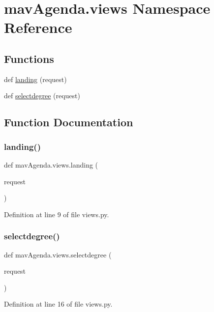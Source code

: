 \hypertarget{namespacemavAgenda_1_1views}{}\section{mav\+Agenda.\+views Namespace Reference}
\label{namespacemavAgenda_1_1views}
\subsection*{Functions}
\begin{DoxyCompactItemize}
\item 
def \mbox{\hyperlink{namespacemavAgenda_1_1views_a8653f38c95e8def94a868eeb549fd0c2}{landing}} (request)
\item 
def \mbox{\hyperlink{namespacemavAgenda_1_1views_a64ca2f2eecfd09c44da85271651c9af2}{selectdegree}} (request)
\end{DoxyCompactItemize}


\subsection{Function Documentation}
\mbox{\label{namespacemavAgenda_1_1views_a8653f38c95e8def94a868eeb549fd0c2}} 
\subsubsection{\texorpdfstring{landing()}{landing()}}
{\footnotesize\ttfamily def mav\+Agenda.\+views.\+landing (\begin{DoxyParamCaption}\item[{}]{request }\end{DoxyParamCaption})}



Definition at line 9 of file views.\+py.

\mbox{\label{namespacemavAgenda_1_1views_a64ca2f2eecfd09c44da85271651c9af2}} 
\subsubsection{\texorpdfstring{selectdegree()}{selectdegree()}}
{\footnotesize\ttfamily def mav\+Agenda.\+views.\+selectdegree (\begin{DoxyParamCaption}\item[{}]{request }\end{DoxyParamCaption})}



Definition at line 16 of file views.\+py.

